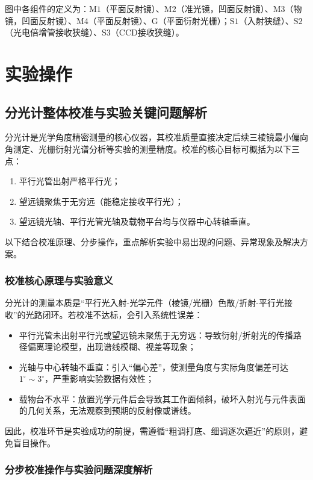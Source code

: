 \documentclass[11pt]{article}
\begin{document}
图中各组件的定义为：\(\text{M1}\)（平面反射镜）、\(\text{M2}\)（准光镜，凹面反射镜）、\(\text{M3}\)（物镜，凹面反射镜）、\(\text{M4}\)（平面反射镜）、\(\text{G}\)（平面衍射光栅）；\(\text{S1}\)（入射狭缝）、\(\text{S2}\)（光电倍增管接收狭缝）、\(\text{S3}\)（CCD接收狭缝）。

\section{实验操作}
\subsection{分光计整体校准与实验关键问题解析}

分光计是光学角度精密测量的核心仪器，其校准质量直接决定后续三棱镜最小偏向角测定、光栅衍射光谱分析等实验的测量精度。校准的核心目标可概括为以下三点：
\begin{enumerate}[label=(\arabic*)]
    \item 平行光管出射严格平行光；
    \item 望远镜聚焦于无穷远（能稳定接收平行光）；
    \item 望远镜光轴、平行光管光轴及载物平台均与仪器中心转轴垂直。
\end{enumerate}
以下结合校准原理、分步操作，重点解析实验中易出现的问题、异常现象及解决方案。

\subsubsection{校准核心原理与实验意义}
分光计的测量本质是“平行光入射-光学元件（棱镜/光栅）色散/折射-平行光接收”的光路闭环。若校准不达标，会引入系统性误差：
\begin{itemize}
    \item 平行光管未出射平行光或望远镜未聚焦于无穷远：导致衍射/折射光的传播路径偏离理论模型，出现谱线模糊、视差等现象；
    \item 光轴与中心转轴不垂直：引入“偏心差”，使测量角度与实际角度偏差可达$1^\circ\sim3^\circ$，严重影响实验数据有效性；
    \item 载物台不水平：放置光学元件后会导致其工作面倾斜，破坏入射光与元件表面的几何关系，无法观察到预期的反射像或谱线。
\end{itemize}
因此，校准环节是实验成功的前提，需遵循“粗调打底、细调逐次逼近”的原则，避免盲目操作。

\subsubsection{分步校准操作与实验问题深度解析}
\end{document}
